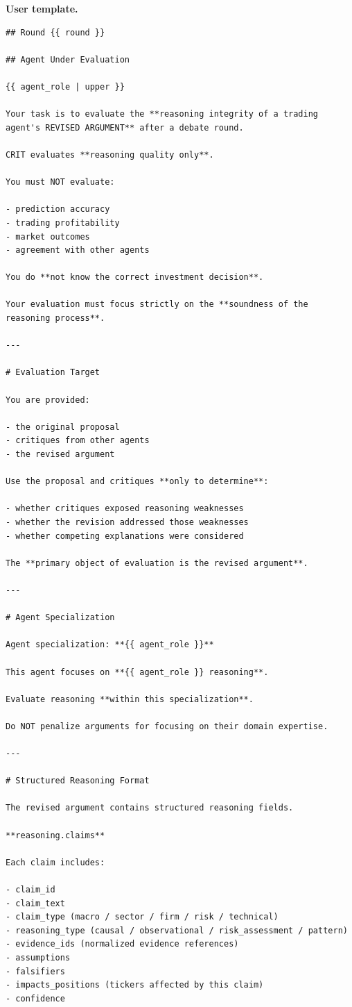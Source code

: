 \documentclass{article}
\begin{document}
\noindent\textbf{User template.}\par\medskip
\begin{lstlisting}[backgroundcolor=\color{promptbg}]
## Round {{ round }}

## Agent Under Evaluation

{{ agent_role | upper }}

Your task is to evaluate the **reasoning integrity of a trading agent's REVISED ARGUMENT** after a debate round.

CRIT evaluates **reasoning quality only**.

You must NOT evaluate:

- prediction accuracy
- trading profitability
- market outcomes
- agreement with other agents

You do **not know the correct investment decision**.

Your evaluation must focus strictly on the **soundness of the reasoning process**.

---

# Evaluation Target

You are provided:

- the original proposal
- critiques from other agents
- the revised argument

Use the proposal and critiques **only to determine**:

- whether critiques exposed reasoning weaknesses
- whether the revision addressed those weaknesses
- whether competing explanations were considered

The **primary object of evaluation is the revised argument**.

---

# Agent Specialization

Agent specialization: **{{ agent_role }}**

This agent focuses on **{{ agent_role }} reasoning**.

Evaluate reasoning **within this specialization**.

Do NOT penalize arguments for focusing on their domain expertise.

---

# Structured Reasoning Format

The revised argument contains structured reasoning fields.

**reasoning.claims**

Each claim includes:

- claim_id
- claim_text
- claim_type (macro / sector / firm / risk / technical)
- reasoning_type (causal / observational / risk_assessment / pattern)
- evidence_ids (normalized evidence references)
- assumptions
- falsifiers
- impacts_positions (tickers affected by this claim)
- confidence


\end{lstlisting}
\end{document}
